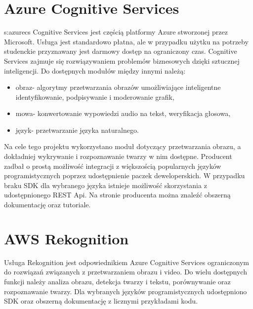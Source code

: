 \section{Azure Cognitive Services}{s:azurecs}
Cognitive Services jest częścią platformy Azure stworzonej przez Microsoft. Usługa jest standardowo płatna, ale w przypadku użytku na potrzeby studenckie przyznawany jest darmowy dostęp na ograniczony czas. Cognitive Services zajmuje się rozwiązywaniem problemów biznesowych dzięki sztucznej inteligencji. Do dostępnych modułów między innymi należą:
\begin{itemize}
\item obraz- algorytmy przetwarzania obrazów umożliwiające inteligentne identyfikowanie, podpisywanie i moderowanie grafik,
\item mowa- konwertowanie wypowiedzi audio na tekst, weryfikacja głosowa,
\item język- przetwarzanie języka naturalnego.
\end{itemize}
Na cele tego projektu wykorzystano moduł dotyczący przetwarzania obrazu, a dokładniej wykrywanie i rozpoznawanie twarzy w nim dostępne. Producent zadbał o prostą możliwość integracji z większością popularnych języków programistycznych poprzez udostępnienie paczek deweloperskich. W przypadku braku SDK dla wybranego języka istnieje możliwość skorzystania z udostępnionego REST Api. Na stronie producenta można znaleźć obszerną dokumentację oraz tutoriale.

\section{AWS Rekognition}
Usługa Rekognition jest odpowiednikiem Azure Cognitive Services ograniczonym do rozwiązań związanych z przetwarzaniem obrazu i video. Do wielu dostępnych funkcji należy analiza obrazu, detekcja twarzy i tekstu, porównywanie oraz rozpoznawanie twarzy. Dla wybranych języków programistycznych udostępniono SDK oraz obszerną dokumentację z licznymi przykładami kodu.
